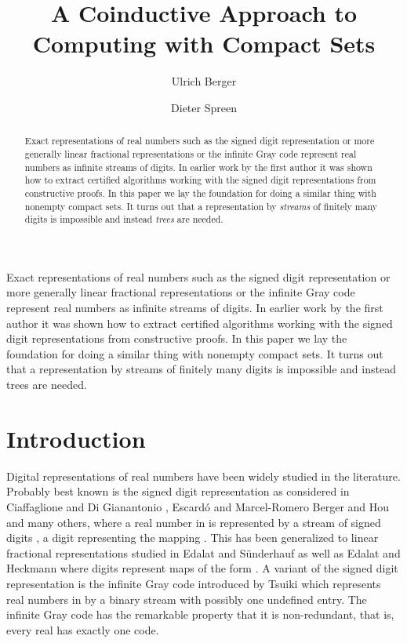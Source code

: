 \documentclass[microtype]{jloganal}
\title[A Coinductive Approach to Computing with Compact Sets]{A Coinductive Approach to Computing with Compact Sets}
\author[Ulrich Berger]{Ulrich Berger}
\author[Dieter Spreen]{Dieter Spreen}
\theoremstyle{plain}
\theoremstyle{definition}
\begin{document}
\begin{abstract}
  Exact representations of real numbers such as the signed digit
  representation or more generally linear fractional representations or the
  infinite Gray code represent real numbers as infinite streams of digits. In
  earlier work by the first author it was shown how to extract certified
  algorithms working with the signed digit representations from constructive
  proofs. In this paper we lay the foundation for doing a similar thing with
  nonempty compact sets. It turns out that a representation by \emph{streams}
  of finitely many digits is impossible and instead \emph{trees} are needed.
\end{abstract}

\begin{asciiabstract}
Exact representations of real numbers such as the signed digit
  representation or more generally linear fractional representations or the
  infinite Gray code represent real numbers as infinite streams of digits. In
  earlier work by the first author it was shown how to extract certified
  algorithms working with the signed digit representations from constructive
  proofs. In this paper we lay the foundation for doing a similar thing with
  nonempty compact sets. It turns out that a representation by streams
  of finitely many digits is impossible and instead trees are needed.
  \end{asciiabstract}
  
  \maketitle
  


\section{Introduction}
\label{sec-intro}
Digital representations of real numbers have been widely studied in the 
literature. Probably best known is the signed digit representation as 
considered in 
Ciaffaglione and Di Gian\-antonio \cite{CiaffaglioneGianantonio06}, 
Escard\'{o} and Marcel-Romero \cite{EscardoMarcial-Romero07}
Berger and Hou~\cite{BergerHou08}
and many others, 
where a real number in  is represented by a stream of 
signed digits , a digit  representing the mapping 
. This has been generalized
to linear fractional representations studied in Edalat and 
S\"underhauf \cite{EdalatSuenderhauf98} as well as Edalat and 
Heckmann  \cite{EdalatHeckmann02}
where digits represent maps of the form .
A variant of the signed digit representation is the infinite
Gray code introduced by Tsuiki \cite{Tsuiki02} which represents real 
numbers in  by a binary stream
with possibly one undefined entry. The infinite Gray code has the 
remarkable property
that it is non-redundant, that is, every real has exactly one code.
\end{document}
